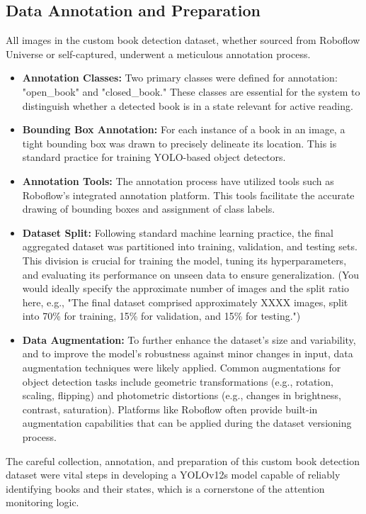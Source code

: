 \subsection{Data Annotation and Preparation}
All images in the custom book detection dataset, whether sourced from Roboflow Universe or self-captured, underwent a meticulous annotation process.
\begin{itemize}
    \item \textbf{Annotation Classes:} Two primary classes were defined for annotation: "open\_book" and "closed\_book." These classes are essential for the system to distinguish whether a detected book is in a state relevant for active reading.
    \item \textbf{Bounding Box Annotation:} For each instance of a book in an image, a tight bounding box was drawn to precisely delineate its location. This is standard practice for training YOLO-based object detectors.
    \item \textbf{Annotation Tools:} The annotation process have utilized tools such as Roboflow's integrated annotation platform. This tools facilitate the accurate drawing of bounding boxes and assignment of class labels.
    \item \textbf{Dataset Split:} Following standard machine learning practice, the final aggregated dataset was partitioned into training, validation, and testing sets. This division is crucial for training the model, tuning its hyperparameters, and evaluating its performance on unseen data to ensure generalization. (You would ideally specify the approximate number of images and the split ratio here, e.g., "The final dataset comprised approximately XXXX images, split into 70\% for training, 15\% for validation, and 15\% for testing.")
    \item \textbf{Data Augmentation:} To further enhance the dataset's size and variability, and to improve the model's robustness against minor changes in input, data augmentation techniques were likely applied. Common augmentations for object detection tasks include geometric transformations (e.g., rotation, scaling, flipping) and photometric distortions (e.g., changes in brightness, contrast, saturation). Platforms like Roboflow often provide built-in augmentation capabilities that can be applied during the dataset versioning process.
\end{itemize}

The careful collection, annotation, and preparation of this custom book detection dataset were vital steps in developing a YOLOv12s model capable of reliably identifying books and their states, which is a cornerstone of the attention monitoring logic.

